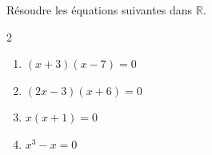 \begin{exo}{}
	Résoudre les équations suivantes dans $\mathbb{R}$.

	\vspace*{-2mm}
	\begin{multicols}{2}
		\begin{enumerate}
			\item $(x + 3)(x - 7) = 0$
			\item $(2x - 3)(x + 6) = 0$
			\item $x(x + 1) = 0$
			\item $x^3 - x = 0$
		\end{enumerate}
	\end{multicols}
\end{exo}
